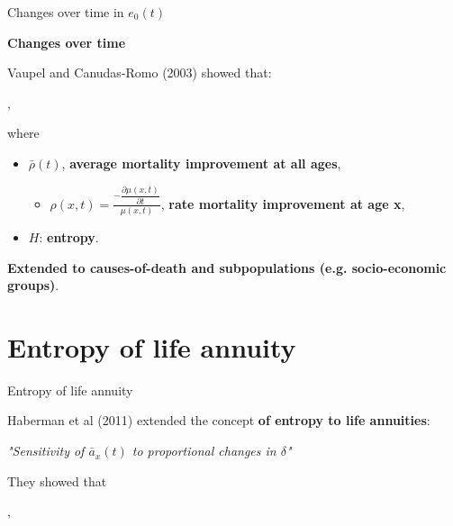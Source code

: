 \documentclass[10pt]{beamer}
\begin{document}
\begin{frame}{Changes over time in $e_0(t)$}

\textbf{Changes over time}

\begin{center}
	\pause
\end{center}


Vaupel and Canudas-Romo (2003) showed that:

\begin{center}
	, \pause
\end{center}


where 

\begin{itemize}
	\item $\bar{\rho}(t)$, \textbf{average mortality improvement at all ages}, \pause
	\begin{itemize}
		\item $\rho(x,t)= \frac{-\dfrac{\partial \mu(x,t)}{\partial t}}{\mu(x,t)}$, \textbf{rate mortality improvement at age x}, \pause
	\end{itemize}
	
	\item $H$: \textbf{entropy}. \pause
\end{itemize}

\textbf{Extended to causes-of-death and subpopulations (e.g. socio-economic groups)}.
\end{frame}



\section{Entropy of life annuity}

\begin{frame}{Entropy of life annuity}

Haberman et al (2011) extended the concept \textbf{of entropy to life annuities}: \pause

\begin{center}
\end{center}

\begin{center}
\textit{"Sensitivity of $\bar{a}_x(t)$ to proportional changes in $\delta$"}\pause
\end{center}

They showed that


\begin{center}
	, \pause
\end{center}

\end{frame}
\end{document}

